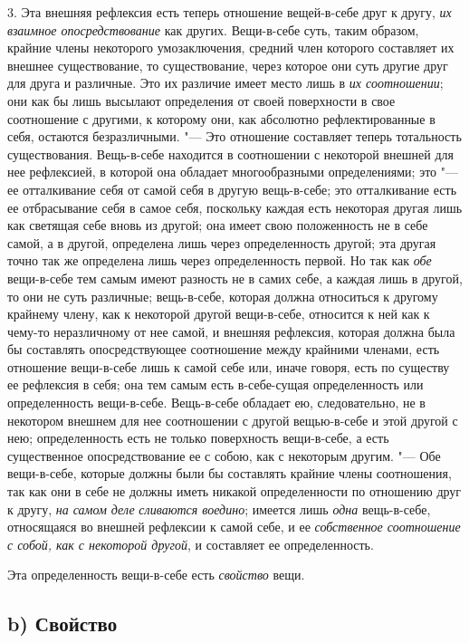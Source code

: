 3. Эта внешняя рефлексия есть теперь отношение вещей-в-себе друг к другу,
{\em их взаимное опосредствование} как других.
Вещи-в-себе суть, таким образом, крайние члены некоторого умозаключения,
средний член которого составляет их внешнее существование, то
существование, через которое они суть другие друг для друга и различные.
Это их различие имеет место лишь в {\em их
соотношении}; они как бы лишь высылают определения от своей поверхности в
свое соотношение с другими, к которому они, как абсолютно рефлектированные
в себя, остаются безразличными. "--- Это отношение составляет теперь
тотальность существования. Вещь-в-себе находится в соотношении с некоторой
внешней для нее рефлексией, в которой она обладает многообразными
определениями; это "--- ее отталкивание себя от самой себя в другую вещь-в-себе;
это отталкивание есть ее отбрасывание себя в самое себя, поскольку каждая
есть некоторая другая лишь как светящая себе вновь из другой; она имеет
свою положенность не в себе самой, а в другой, определена лишь через
определенность другой; эта другая точно так же определена лишь через
определенность первой. Но так как {\em обе} вещи-в-себе
тем самым имеют разность не в самих себе, а каждая лишь в другой, то они не
суть различные; вещь-в-себе, которая должна относиться к другому крайнему
члену, как к некоторой другой вещи-в-себе, относится к ней как к чему-то
неразличному от нее самой, и внешняя рефлексия, которая должна была бы
составлять опосредствующее соотношение между крайними членами, есть
отношение вещи-в-себе лишь к самой себе или, иначе говоря, есть по существу
ее рефлексия в себя; она тем самым есть в-себе-сущая определенность или
определенность вещи-в-себе. Вещь-в-себе обладает ею, следовательно, не в
некотором внешнем для нее соотношении с другой вещью-в-себе и этой другой с
нею; определенность есть не только поверхность вещи-в-себе, а есть
существенное опосредствование ее с собою, как с некоторым другим. "--- Обе
вещи-в-себе, которые должны были бы составлять крайние члены соотношения,
так как они в себе не должны иметь никакой определенности по отношению друг
к другу, {\em на самом деле }{\em сливаются воедино}; имеется лишь
{\em одна} вещь-в-себе, относящаяся во внешней
рефлексии к самой себе, и ее {\em собственное
соотношение с собой, как с некоторой другой}, и составляет ее определенность.

Эта определенность вещи-в-себе есть {\em свойство} вещи.


\subsection[b) Свойство]{b) Свойство}

